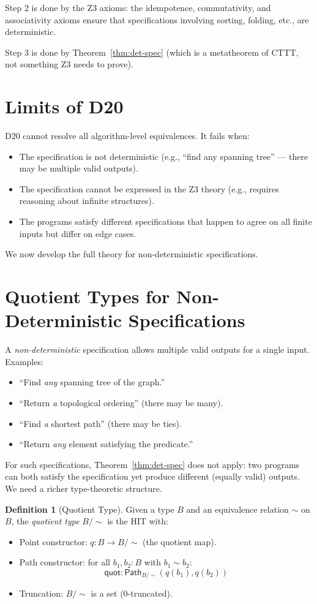 \documentclass[11pt,a4paper]{report}
\theoremstyle{definition}
\newtheorem{definition}{Definition}[chapter]
\theoremstyle{plain}
\newcommand{\Path}{\mathsf{Path}}
\begin{document}
Step 2 is done by the Z3 axioms: the idempotence, commutativity,
and associativity axioms ensure that specifications involving sorting,
folding, etc., are deterministic.

Step 3 is done by Theorem~\ref{thm:det-spec} (which is a metatheorem
of CTTT, not something Z3 needs to prove).

\section{Limits of D20}

D20 cannot resolve all algorithm-level equivalences.  It fails when:
\begin{itemize}
  \item The specification is not deterministic (e.g., ``find any
    spanning tree'' --- there may be multiple valid outputs).
  \item The specification cannot be expressed in the Z3 theory
    (e.g., requires reasoning about infinite structures).
  \item The programs satisfy different specifications that happen
    to agree on all finite inputs but differ on edge cases.
\end{itemize}

We now develop the full theory for non-deterministic specifications.

\section{Quotient Types for Non-Deterministic Specifications}

A \emph{non-deterministic} specification allows multiple valid outputs
for a single input.  Examples:
\begin{itemize}
  \item ``Find \emph{any} spanning tree of the graph.''
  \item ``Return \emph{a} topological ordering'' (there may be many).
  \item ``Find \emph{a} shortest path'' (there may be ties).
  \item ``Return \emph{any} element satisfying the predicate.''
\end{itemize}

For such specifications, Theorem~\ref{thm:det-spec} does not apply:
two programs can both satisfy the specification yet produce different
(equally valid) outputs.  We need a richer type-theoretic structure.

\begin{definition}[Quotient Type]
\label{def:quotient}
Given a type $B$ and an equivalence relation $\sim$ on $B$, the
\emph{quotient type} $B / {\sim}$ is the HIT with:
\begin{itemize}
  \item Point constructor: $q : B \to B / {\sim}$
    (the quotient map).
  \item Path constructor: for all $b_1, b_2 : B$ with $b_1 \sim b_2$:
    \[
      \mathsf{quot} : \Path_{B/{\sim}}(q(b_1), q(b_2))
    \]
  \item Truncation: $B / {\sim}$ is a set (0-truncated).
\end{itemize}
\end{definition}
\end{document}
